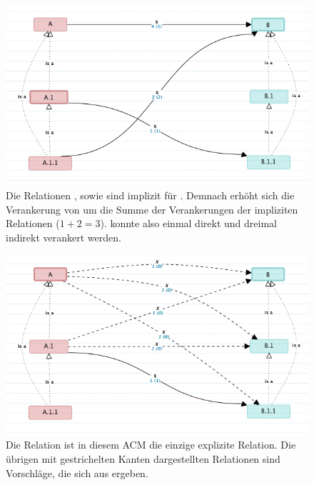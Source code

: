 \begin{figure}
  \centering
    \includegraphics[width=1.0\linewidth]{Figures/implicit_relations.png}
  \caption[APIUA: Modellierung --- Implizite Relationen]{Die Relationen , sowie  sind implizit für . Demnach erhöht sich die Verankerung von  um die Summe der Verankerungen der impliziten Relationen ($1+2=3$).  konnte also einmal direkt und dreimal indirekt verankert werden.}
  \label{fig:ImplicitRelations}
\end{figure}

\begin{figure}
  \centering
    \includegraphics[width=1.0\linewidth]{Figures/proposed_relations1.png}
  \caption[APIUA: Modellierung --- Hypothetische Relationen I]{Die Relation  ist in diesem ACM die einzige explizite Relation. Die übrigen mit gestrichelten Kanten dargestellten Relationen sind Vorschläge, die sich aus  ergeben.}
  \label{fig:ProposedRelations1}
\end{figure}

